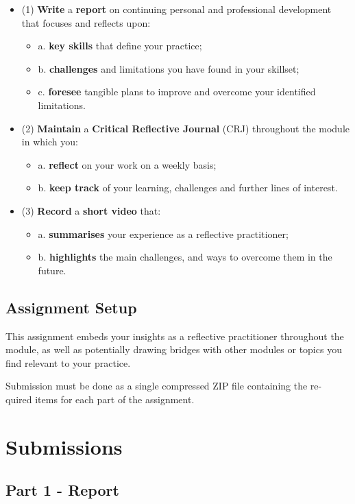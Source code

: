 \documentclass{../../fal_assignment}
\begin{document}
\begin{itemize}
		\item (1)  \textbf{Write} a  \textbf{report} on continuing personal and professional development that focuses and reflects upon:
		\begin{itemize}
			\item a.  \textbf{key skills} that define your practice;
			\item b.  \textbf{challenges} and limitations you have found in your skillset;
			\item c.  \textbf{foresee} tangible plans to improve and overcome your identified limitations.
		\end{itemize}
		\item (2)  \textbf{Maintain} a \textbf{Critical Reflective Journal} (CRJ) throughout the module in which you:
		\begin{itemize}
			\item a.  \textbf{reflect} on your work on a weekly basis;
			\item b.  \textbf{keep track} of your learning, challenges and further lines of interest.
		\end{itemize}
		\item (3)  \textbf{Record} a  \textbf{short video} that:
		\begin{itemize}
			\item a.  \textbf{summarises} your experience as a reflective practitioner;
			\item b.  \textbf{highlights} the main challenges, and ways to overcome them in the future.
		\end{itemize}
\end{itemize}
\subsection*{Assignment Setup} 

This assignment embeds your insights as a reflective practitioner throughout the module, as well as potentially drawing bridges with other modules or topics you find relevant to your practice.

Submission must be done as a single compressed ZIP file containing the re- quired items for each part of the assignment.
\pagebreak
\section*{Submissions}
\subsection*{Part 1 - Report} 
\end{document}
